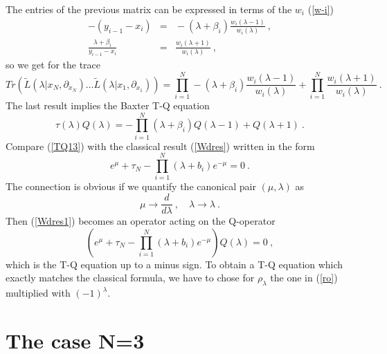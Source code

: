 \documentclass[a4paper,11pt]{article}
\begin{document}
The entries of the previous matrix can be expressed in terms of the $w_i$
(\ref{w-i})
\begin{eqnarray}
\label{TQ11}
-(y_{i-1}-x_i) \!\!\!&=&\!\!\! -(\lambda +\beta_i)\frac{w_i(\lambda-1)}{w_i(\lambda )} ~,\\
\frac{\lambda +\beta_i}{y_{i-1}-x_i} \!\!\!&=&\!\!\! \frac{w_i(\lambda+1)}{w_i(\lambda )} ~,
\end{eqnarray}
so we get for the trace
\begin{equation}
\label{TQ12}
Tr\left({\tilde L}(\lambda|x_N,\partial_{x_N}) \ldots
    {\tilde L}(\lambda|x_1,\partial_{x_1})\right)
    =\prod_{i=1}^N -(\lambda +\beta_i)\frac{w_i(\lambda-1)}{w_i(\lambda )}
    +\prod_{i=1}^N\frac{w_i(\lambda+1)}{w_i(\lambda )} ~.
\end{equation}
The last result implies the Baxter T-Q equation
\begin{equation}
\label{TQ13}
\tau (\lambda )Q(\lambda )
    =-\prod_{i=1}^N (\lambda +\beta_i) Q(\lambda -1)+Q(\lambda +1) ~.
\end{equation}
Compare (\ref{TQ13}) with the classical result (\ref{Wdres}) written in the
form
\begin{equation}
\label{Wdres1}
e^{\mu}+\tau_N-\prod_{i=1}^N(\lambda+b_i)e^{-\mu}=0 ~.
\end{equation}
The connection is obvious if we quantify the canonical pair $(\mu,\lambda )$ as
\begin{equation}
\label{quant_mu}
\mu \to \frac{d}{d\lambda} ~,\quad \lambda \to \lambda ~.
\end{equation}
Then (\ref{Wdres1}) becomes an operator acting on the Q-operator
\begin{equation}
\label{Wdres_quant}
\left(e^{\mu}+\tau_N-\prod_{i=1}^N(\lambda+b_i)e^{-\mu}\right) Q(\lambda )=0 ~,
\end{equation}
which is the T-Q equation up to a minus sign. To obtain a T-Q equation which
exactly matches the classical formula, we have to chose for $\rho _\lambda $
the one in (\ref{ro}) multiplied with $(-1)^{\lambda }$.

\section{The case N=3}
\end{document}
